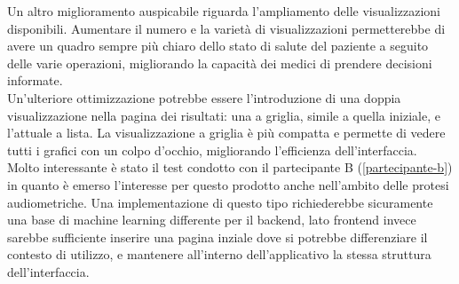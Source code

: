 Un altro miglioramento auspicabile riguarda l'ampliamento delle visualizzazioni disponibili. Aumentare il numero e la varietà di visualizzazioni permetterebbe di avere un quadro sempre più chiaro dello stato di salute del paziente a seguito delle varie operazioni, migliorando la capacità dei medici di prendere decisioni informate.\\

Un'ulteriore ottimizzazione potrebbe essere l'introduzione di una doppia visualizzazione nella pagina dei risultati: una a griglia, simile a quella iniziale, e l'attuale a lista. La visualizzazione a griglia è più compatta e permette di vedere tutti i grafici con un colpo d'occhio, migliorando l'efficienza dell'interfaccia.\\

Molto interessante è stato il test condotto con il partecipante B (\ref{partecipante-b}) in quanto è emerso l'interesse per questo prodotto anche nell'ambito delle protesi audiometriche. Una implementazione di questo tipo richiederebbe sicuramente una base di machine learning differente per il backend, lato frontend invece sarebbe sufficiente inserire una pagina inziale dove si potrebbe differenziare il contesto di utilizzo, e mantenere all'interno dell'applicativo la stessa struttura dell'interfaccia. 

